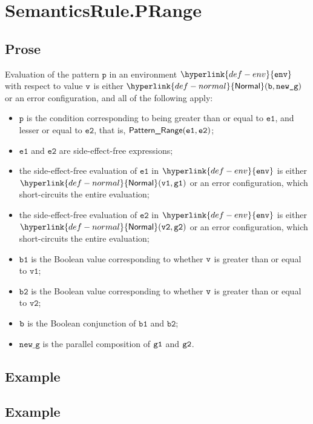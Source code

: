 \documentclass{book}
\newcommand\ProseOrError[0]{or an error configuration, which short-circuits the entire evaluation}
\newcommand\Normal[0]{\hyperlink{def-normal}{\textsf{Normal}}}
\newcommand\env[0]{\hyperlink{def-env}{\texttt{env}}}
\newcommand\newg[0]{\texttt{new\_g}}
\newcommand\vp[0]{\texttt{p}}
\newcommand\vvone[0]{\texttt{v1}}
\newcommand\vvtwo[0]{\texttt{v2}}
\newcommand\veone[0]{\texttt{e1}}
\newcommand\vetwo[0]{\texttt{e2}}
\newcommand\vbone[0]{\texttt{b1}}
\newcommand\vbtwo[0]{\texttt{b2}}
\begin{document}

\section{SemanticsRule.PRange \label{sec:SemanticsRule.PRange}}
    \subsection{Prose}
    Evaluation of the pattern $\vp$ in an environment $\env$ with
    respect to value $\texttt{v}$ is either $\Normal(\vb, \newg)$ or an error configuration,
    and all of the following apply:
    \begin{itemize}
      \item $\vp$ is the condition corresponding to being greater than or equal
        to $\veone$, and lesser or equal to $\vetwo$, that is, $\PatternRange(\veone, \vetwo)$;
      \item $\veone$ and $\vetwo$ are side-effect-free expressions;
      \item the side-effect-free evaluation of $\veone$ in $\env$ is either $\Normal(\vvone, \vgone)$ \ProseOrError;
      \item the side-effect-free evaluation of $\vetwo$ in $\env$ is either $\Normal(\vvtwo, \vgtwo)$ \ProseOrError;
      \item $\vbone$ is the Boolean value corresponding to whether
        $\texttt{v}$ is greater than or equal to $\vvone$;
        \item $\vbtwo$ is the Boolean value corresponding to whether
        $\texttt{v}$ is greater than or equal to $\vvtwo$;
      \item $\texttt{b}$ is the Boolean conjunction of $\vbone$ and
      $\vbtwo$;
      \item $\newg$ is the parallel composition of $\texttt{g1}$ and $\texttt{g2}$.
    \end{itemize}

    \subsection{Example}

    \subsection{Example}
\end{document}

